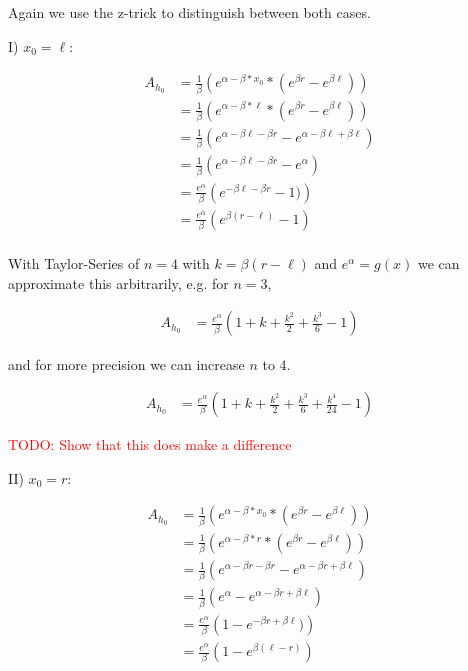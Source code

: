 \documentclass[]{article}
\begin{document}
Again we use the z-trick to distinguish between both cases.


I) $x_0 = \ell$:

\begin{align*}
	A_{h_0} &= \frac{1}{\beta} \left( e^{\alpha - \beta * x_0} * \left(e^{\beta r} - e^{\beta \ell} \right) \right) \\
	&= \frac{1}{\beta} \left( e^{\alpha - \beta * \ell} * \left(e^{\beta r} - e^{\beta \ell} \right) \right) \\
	&= \frac{1}{\beta} \left(e^{\alpha - \beta \ell - \beta r} - e^{\alpha - \beta \ell + \beta \ell} \right) \\
	&= \frac{1}{\beta} \left(e^{\alpha - \beta \ell - \beta r} - e^{\alpha} \right) \\
	&= \frac{e^{\alpha}}{\beta} \left(e^{- \beta \ell - \beta r} - 1) \right) \\
	&= \frac{e^{\alpha}}{\beta} \left(e^{\beta (r - \ell)} - 1 \right) \\
\end{align*}

With Taylor-Series of $n = 4$ with $k = \beta (r - \ell)$ and $e^{\alpha} = g(x)$ we can approximate this arbitrarily,
e.g. for $n = 3$,

\begin{align*}
	A_{h_0} &= \frac{e^{\alpha}}{\beta} \left(1 + k + \frac{k^2}{2} +  \frac{k^3}{6} - 1 \right)
\end{align*}

and for more precision we can increase $n$ to $4$.

\begin{align*}
	A_{h_0} &= \frac{e^{\alpha}}{\beta} \left(1 + k + \frac{k^2}{2} +  \frac{k^3}{6} + \frac{k^4}{24} - 1 \right)
\end{align*}

\textcolor{red}{TODO: Show that this does make a difference}

II) $x_0 = r$:

\begin{align*}
	A_{h_0} &= \frac{1}{\beta} \left( e^{\alpha - \beta * x_0} * \left(e^{\beta r} - e^{\beta \ell} \right) \right) \\
	&= \frac{1}{\beta} \left( e^{\alpha - \beta * r} * \left(e^{\beta r} - e^{\beta \ell} \right) \right) \\
	&= \frac{1}{\beta} \left(e^{\alpha - \beta r - \beta r} - e^{\alpha - \beta r + \beta \ell} \right) \\
	&= \frac{1}{\beta} \left(e^{\alpha} - e^{\alpha - \beta r + \beta \ell} \right) \\
	&= \frac{e^{\alpha}}{\beta} \left(1 - e^{- \beta r + \beta \ell} ) \right) \\
	&= \frac{e^{\alpha}}{\beta} \left(1 - e^{\beta (\ell - r)}  \right) \\
\end{align*}
\end{document}
